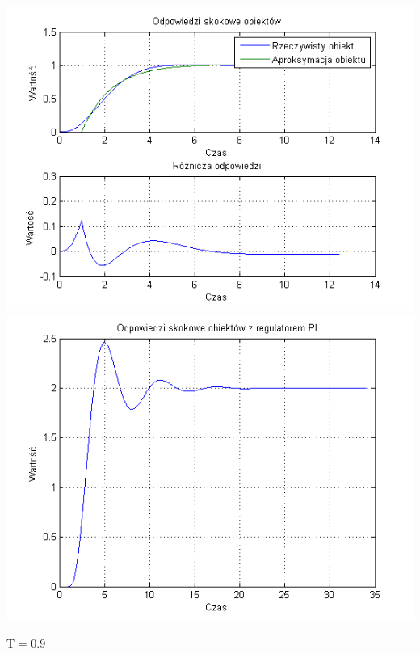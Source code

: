 \documentclass[10pt,a4paper]{article}
\begin{document}
\begin{center}
\includegraphics[scale=1]{images/jeden/skrypt_261.png}\\
\includegraphics[scale=1]{images/jeden/skrypt_262.png}\\
\end{center}
\newpage
T = 0.9
\end{document}
